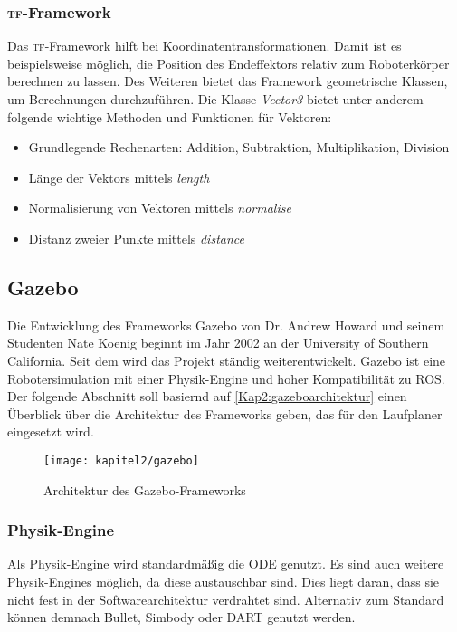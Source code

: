 \subsubsection{\textsc{tf}-Framework}

Das \textsc{tf}-Framework hilft bei Koordinatentransformationen. Damit ist es beispielsweise möglich, die Position des Endeffektors relativ zum Roboterkörper berechnen zu lassen. Des Weiteren bietet das Framework geometrische Klassen, um Berechnungen durchzuführen. Die Klasse \emph{Vector3} bietet unter anderem folgende wichtige Methoden und Funktionen für Vektoren:
\begin{itemize}
  \item Grundlegende Rechenarten: Addition, Subtraktion, Multiplikation, Division
  \item Länge der Vektors mittels \emph{length}
  \item Normalisierung von Vektoren mittels \emph{normalise}
  \item Distanz zweier Punkte mittels \emph{distance}
\end{itemize}

\subsection{Gazebo}

Die Entwicklung des Frameworks Gazebo von Dr. Andrew Howard und seinem Studenten Nate Koenig beginnt im Jahr 2002 an der University of Southern California. Seit dem wird das Projekt ständig weiterentwickelt. Gazebo ist eine Robotersimulation mit einer Physik-Engine und hoher Kompatibilität zu \ac{ROS}. Der folgende Abschnitt soll basiernd auf \autoref{Kap2:gazeboarchitektur} einen Überblick über die Architektur des Frameworks geben, das für den Laufplaner eingesetzt wird. \autocite{gazebosim} \autocite{Koenig-2004-394}

\begin{figure}[b!]
  \centering
  \texttt{[image: kapitel2/gazebo]}
  \caption[Architektur des Gazebo-Frameworks]{Architektur des Gazebo-Frameworks \autocite{Koenig-2004-394}}
  \label{Kap2:gazeboarchitektur}
\end{figure}

\subsubsection{Physik-Engine}

Als Physik-Engine wird standardmäßig die \ac{ODE} genutzt. Es sind auch weitere Physik-Engines möglich, da diese austauschbar sind. Dies liegt daran, dass sie nicht fest in der Softwarearchitektur verdrahtet sind. Alternativ zum Standard können demnach Bullet, Simbody oder DART genutzt werden.
    
